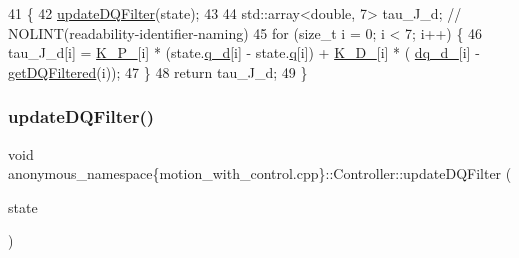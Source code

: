 \begin{DoxyCode}
41                                                            \{
42     \hyperlink{classanonymous__namespace_02motion__with__control_8cpp_03_1_1Controller_ac86ec8f40861e51605d5f9c5921c799f}{updateDQFilter}(state);
43 
44     std::array<double, 7> tau\_J\_d;  \textcolor{comment}{// NOLINT(readability-identifier-naming)}
45     \textcolor{keywordflow}{for} (\textcolor{keywordtype}{size\_t} i = 0; i < 7; i++) \{
46       tau\_J\_d[i] = \hyperlink{classanonymous__namespace_02motion__with__control_8cpp_03_1_1Controller_a5d89d12c8a2909c46bb45adf35073db2}{K\_P\_}[i] * (state.\hyperlink{structfranka_1_1RobotState_a706045af1b176049e9e56df755325bd2}{q\_d}[i] - state.\hyperlink{structfranka_1_1RobotState_ade3335d1ac2f6c44741a916d565f7091}{q}[i]) + \hyperlink{classanonymous__namespace_02motion__with__control_8cpp_03_1_1Controller_a51a2e8093f63934c9d64aa0bb7b46b38}{K\_D\_}[i] * (
      \hyperlink{classanonymous__namespace_02motion__with__control_8cpp_03_1_1Controller_aa5f5437e65c514358d2a22e74bf0075d}{dq\_d\_}[i] - \hyperlink{classanonymous__namespace_02motion__with__control_8cpp_03_1_1Controller_a0d18eda568c814126311d95e851094fb}{getDQFiltered}(i));
47     \}
48     \textcolor{keywordflow}{return} tau\_J\_d;
49   \}
\end{DoxyCode}
\mbox{\label{classanonymous__namespace_02motion__with__control_8cpp_03_1_1Controller_ac86ec8f40861e51605d5f9c5921c799f}} 
\subsubsection{\texorpdfstring{update\+D\+Q\+Filter()}{updateDQFilter()}}
{\footnotesize\ttfamily void anonymous\+\_\+namespace\{motion\+\_\+with\+\_\+control.\+cpp\}\+::Controller\+::update\+D\+Q\+Filter (\begin{DoxyParamCaption}\item[{const \hyperlink{structfranka_1_1RobotState}{franka\+::\+Robot\+State} \&}]{state }\end{DoxyParamCaption})\hspace{0.3cm}{\ttfamily [inline]}}



